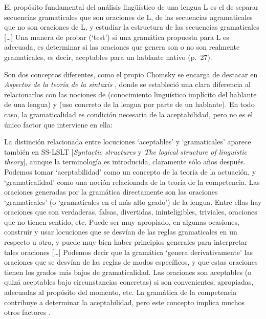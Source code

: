 \begin{cita}
El propósito fundamental del análisis lingüístico de una lengua L es el de
separar secuencias gramaticales que son oraciones de L, de las secuencias
agramaticales que no son oraciones de L, y estudiar la estructura de las
secuencias gramaticales [\ldots] Una manera de probar (\enquote*{test}) si una
gramática propuesta para L es adecuada, es determinar si las oraciones que
genera son o no son realmente gramaticales, es decir, aceptables para un
hablante nativo (p.~27).
\end{cita}

Son dos conceptos diferentes, como el propio Chomsky se encarga de destacar en
\textit{Aspectos de la teoría de la sintaxis} \parencite{chomsky1970}, donde se
estableció una clara diferencia al relacionarlos con las nociones de
 (conocimiento lingüístico implícito del hablante de una
lengua) y  (uso concreto de la lengua por parte de un
hablante). En todo caso, la gramaticalidad es condición necesaria de la
aceptabilidad, pero no es el único factor que interviene en ella:

\begin{cita}
La distinción relacionada entre locuciones \enquote*{aceptables} y
\enquote*{gramaticales} aparece también en SS-LSLT [\textit{Syntactic
structures} y \textit{The logical structure of linguistic theory}], aunque la
terminología es introducida, claramente sólo años después. Podemos tomar
\enquote*{aceptabilidad} como un concepto de la teoría de la actuación, y
\enquote*{gramaticalidad} como una noción relacionada de la teoría de la
competencia. Las oraciones generadas por la gramática directamente son las
oraciones \enquote*{gramaticales} (o \enquote*{gramaticales en el más alto
grado}) de la lengua. Entre ellas hay oraciones que son verdaderas, falsas,
divertidas, ininteligibles, triviales, oraciones que no tienen sentido, etc.
Puede ser muy apropiado, en algunas ocasiones, construir y usar locuciones que
se desvían de las reglas gramaticales en un respecto u otro, y puede muy bien
haber principios generales para interpretar tales oraciones [\ldots] Podemos
decir que la gramática \enquote*{genera derivativamente} las oraciones que se
desvían de las reglas de modos específicos, y que estas oraciones tienen los
grados más bajos de gramaticalidad. Las oraciones son aceptables (o quizá
aceptables bajo circunstancias concretas) si son convenientes, apropiadas,
adecuadas al propósito del momento, etc. La gramática de la competencia
contribuye a determinar la aceptabilidad, pero este concepto implica muchos
otros factores \parencite[6-7]{chomsky1974a}.
\end{cita}

